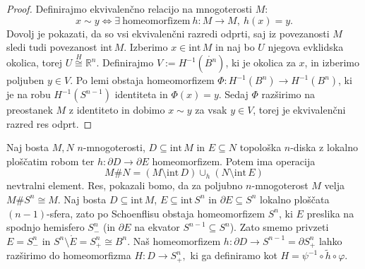 \documentclass[10pt, a4paper]{article}
\newenvironment{noticeC}{%
  \tcolorbox[%
  notitle,
  empty,
  enhanced,  %
  breakable,
  coltext=black, 
  fontupper=\rmfamily,
  parbox=false,
  noparskip,
  sharp corners,
  boxrule=-1pt,  %
  frame hidden,
  left=7pt,  %
  right=7pt,
  top=5pt,
  bottom=5pt,
  before skip=2.5ex plus 2pt,
  after skip=2.5ex plus 2pt,
  overlay unbroken and last={%
  },
  ]}
{\endtcolorbox}
\newenvironment{dokaz}%
  {\begin{noticeC}\begin{proof}}%
  {\end{proof}\end{noticeC}}
\newcommand{\R}{\mathbb {R}}
\newcommand{\intem}{\mathrm{int}\,}
\begin{document}
\begin{dokaz}
  Definirajmo ekvivalenčno relacijo na mnogoterosti $M$:
  $$x \sim y \Leftrightarrow \exists\ \mathrm{homeomorfizem}\ h: M \to M,\ h(x) = y.$$
  Dovolj je pokazati, da so vsi ekvivalenčni razredi odprti, saj iz povezanosti $M$
  sledi tudi povezanost $\intem M$. Izberimo $x \in \intem M$
  in naj bo $U$ njegova evklidska okolica, torej $U \stackrel{H}{\cong} \R^n$.
  Definirajmo $V := H^{-1}(\mathring{B^n})$, ki je okolica za $x$, in izberimo poljuben 
  $y \in V.$ Po lemi obstaja homeomorfizem $\Phi: H^{-1} (B^n) \to H^{-1} (B^n)$,
  ki je na robu $H^{-1} (S^{n - 1})$ identiteta in $\Phi(x) = y.$
  Sedaj $\Phi$ razširimo na preostanek $M$ z identiteto in dobimo 
  $x \sim y$ za vsak $y \in V$, torej je ekvivalenčni razred res odprt.
\end{dokaz}

Naj bosta $M, N$ $n$-mnogoterosti, $D \subseteq \intem M$ in $E \subseteq N$ topološka $n$-diska z lokalno ploščatim robom 
ter $h: \partial D \to \partial E$ homeomorfizem. Potem ima operacija 
$$M \# N = (M \setminus \intem D) \cup_h (N \setminus \intem E)$$
nevtralni element. Res, pokazali bomo, da za poljubno $n$-mnogoterost $M$ velja $M \# S^n \cong M$.
Naj bosta $D \subseteq \intem M$, $E \subseteq \intem S^n$ in $\partial E \subseteq S^n$ 
lokalno ploščata $(n - 1)$-sfera, zato po Schoenflisu obstaja homeomorfizem $S^n$, ki $E$
preslika na spodnjo hemisfero $S^n_-$ (in $\partial E$ na ekvator $S^{n - 1} \subseteq S^n$).
Zato smemo privzeti $E = S^n_-$ in $S^n \setminus \mathring{E} = S_+^n \cong B^n$.
Naš homeomorfizem $h: \partial D \to S^{n - 1} = \partial S_+ ^n$ lahko razširimo do homeomorfizma 
$H: D \to S_+^n,$ ki ga definiramo kot $H = \psi^{-1} \circ \tilde{h} \circ \varphi.$ 
\end{document}
